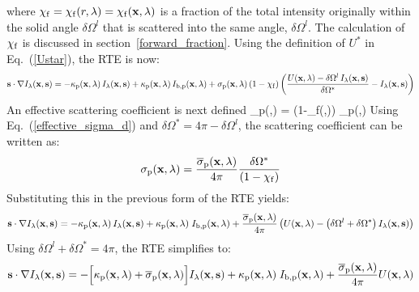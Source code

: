 where $\chi_{\rm f} = \chi_{\rm f}(r,\lambda)=\chi_{\rm f}({\mathbf{x}},\lambda)$ is a fraction of the total intensity originally within the solid angle $\delta\Omega^l$ that is scattered
into the same angle, $\delta\Omega^l$. The calculation of $\chi_{\rm f}$ is discussed in section~\ref{forward_fraction}. Using the definition of $U^*$ in Eq.~(\ref{Ustar}), the RTE is now: 
\begin{equation}
\mathbf{s} \cdot \nabla I_{\lambda}(\mathbf{x},\mathbf{s}) = -\kappa_{\rm p}(\mathbf{x},\lambda) \,
I_{\lambda}(\mathbf{x},\mathbf{s}) + \kappa_{\rm p}(\mathbf{x},\lambda) \, I_{{\rm b,p}}(\mathbf{x},\lambda) +
\sigma_{\rm p}(\mathbf{x},\lambda) \left( 1-\chi_{\rm f} \right) \left( \frac{U(\mathbf{x},\lambda) - \delta\Omega^l \, I_{\lambda}(\mathbf{x},\mathbf{s})}{\delta\Omega^*} - I_{\lambda}(\mathbf{x},\mathbf{s}) \right)
\end{equation}
An effective scattering coefficient is next defined
\be
\label{effective_sigma_d}
\overline{\sigma}_{\rm p}(\bx,\la) =  \Big(1-\chi_{\rm f}(\bx,\la)\Big) \; \sigma_{\rm p}(\bx,\la)
\ee
Using Eq.~(\ref{effective_sigma_d}) and $\delta\Omega^*=4\pi - \delta\Omega^l$, the scattering coefficient can be written as:
\begin{equation}
\sigma_{\rm p}(\mathbf{x},\lambda) = \frac{\overline{\sigma}_{\rm p}(\mathbf{x},\lambda)}{4\pi} \frac{\delta\Omega^*}{\left(1-\chi_{\rm f} \right)}
\end{equation}
Substituting this in the previous form of the RTE yields:
\begin{equation}
\mathbf{s} \cdot \nabla I_{\lambda}(\mathbf{x},\mathbf{s}) = -\kappa_{\rm p}(\mathbf{x},\lambda) \,
I_{\lambda}(\mathbf{x},\mathbf{s}) +\kappa_{\rm p}(\mathbf{x},\lambda) \; I_{{\rm b,p}}(\mathbf{x},\lambda) +
\frac{\overline{\sigma}_{\rm p}(\mathbf{x},\lambda)}{4\pi} \left( U(\mathbf{x},\lambda) - \left( \delta \Omega^l
+ \delta\Omega^* \right) I_{\lambda}(\mathbf{x},\mathbf{s}) \right)
\end{equation}
Using $\delta\Omega^l+ \delta\Omega^*=4\pi $, the RTE simplifies to:
\begin{equation}
\mathbf{s} \cdot \nabla I_{\lambda}(\mathbf{x},\mathbf{s}) = -\Big[\kappa_{\rm p}(\mathbf{x},\lambda) + \overline{\sigma}_{\rm p}(\mathbf{x},\lambda)\Big]
I_{\lambda}(\mathbf{x},\mathbf{s}) +\kappa_{\rm p}(\mathbf{x},\lambda) \; I_{{\rm b,p}}(\mathbf{x},\lambda) +
\frac{\overline{\sigma}_{\rm p}(\mathbf{x},\lambda)}{4\pi} U(\mathbf{x},\lambda)
\end{equation}




